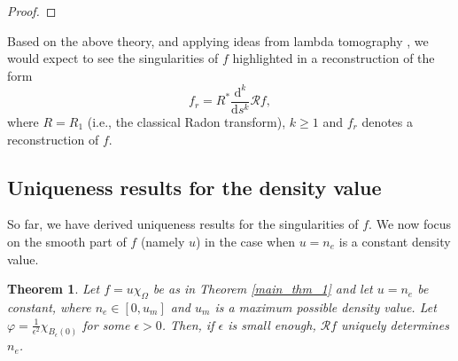 \documentclass[a4paper,12pt]{amsart}
\numberwithin{equation}{section}
\theoremstyle{plain}
\newtheorem{theorem}{Theorem}
\numberwithin{theorem}{section}
\theoremstyle{definition}
\theoremstyle{remark}
\newtheorem{remark}[theorem]{Remark}
\theoremstyle{remark}
\theoremstyle{remark}
\newcommand{\WF}{\mathrm{WF}}                         %
\newcommand{\seanc}[1]{\begin{quotation}\textbf{Sean's comment:\
}{\textit{#1}}\end{quotation}}
\begin{document}
\begin{proof}

\end{proof}

Based on the above theory, and applying ideas from lambda tomography \cite{quinto2009electron}, we would expect to see the singularities of $f$ highlighted in a reconstruction of the form
\begin{equation}
f_r = R^* \frac{\mathrm{d}^k}{\mathrm{d}s^k} \mathcal{R}f,
\end{equation}
where $R = R_1$ (i.e., the classical Radon transform), $k \geq 1$ and $f_r$ denotes a reconstruction of $f$.

\subsection{Uniqueness results for the density value}
So far, we have derived uniqueness results for the singularities of $f$. We now focus on the smooth part of $f$ (namely $u$) in the case when $u = n_e$ is a constant density value.

\begin{theorem}
\label{ne_thm}
Let $f = u\chi_\Omega$ be as in Theorem \ref{main_thm_1} and let $u = n_e$ be constant, where $n_e \in [0, u_m]$ and $u_m$ is a maximum possible density value. Let $\varphi = \frac{1}{\epsilon^2}\chi_{B_\epsilon(0)}$ for some $\epsilon > 0$. Then, if $\epsilon$ is small enough, $\mathcal{R}f$ uniquely determines $n_e$.
\end{theorem}
\end{document}
